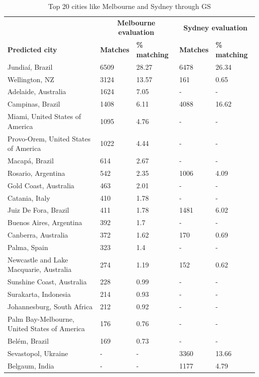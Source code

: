 \documentclass[sageh,times]{sagej}
\begin{document}
\begin{table}[!htbp]
\caption{Top 20 cities like Melbourne and Sydney through GS \label{tab:melbournesydneyGS}}     
\begin{tabular}{| l | l |l| l | l|}
\hline
 \hline    &  \multicolumn{2}{c|}{\textbf{Melbourne evaluation}} & \multicolumn{2}{c|}{\textbf{Sydney evaluation}}  \\  
\textbf{Predicted city} & \textbf{Matches} & \textbf{\% matching}  & \textbf{Matches} & \textbf{\% matching}\\ \hline
Jundia\'{i}, Brazil & 6509 & 28.27 & 6478 & 26.34 \\ \hline
Wellington, NZ & 3124 & 13.57 & 161 & 0.65 \\ \hline
Adelaide, Australia & 1624 & 7.05 &-&- \\ \hline
Campinas, Brazil & 1408 & 6.11 & 4088 & 16.62 \\ \hline
Miami, United States of America & 1095 & 4.76 &-&- \\ \hline
Provo-Orem, United States of America & 1022 & 4.44 &-&- \\ \hline
Macap\'{a}, Brazil & 614 & 2.67 &-&- \\ \hline
Rosario, Argentina & 542 & 2.35 & 1006 & 4.09 \\ \hline
Gold Coast, Australia & 463 & 2.01 &-&- \\ \hline
Catania, Italy & 410 & 1.78 &-&- \\ \hline
Juiz De Fora, Brazil & 411 & 1.78 & 1481 & 6.02 \\ \hline
Buenos Aires, Argentina & 392 & 1.7 &-&- \\ \hline
Canberra, Australia & 372 & 1.62 & 170 & 0.69 \\ \hline
Palma, Spain & 323 & 1.4 &-&- \\ \hline
Newcastle and Lake Macquarie, Australia & 274 & 1.19 & 152 & 0.62 \\ \hline
Sunshine Coast, Australia & 228 & 0.99 &-&- \\ \hline
Surakarta, Indonesia & 214 & 0.93 &-&- \\ \hline
Johannesburg, South Africa & 212 & 0.92 &-&- \\ \hline
Palm Bay-Melbourne, United States of America & 176 & 0.76 &-&- \\ \hline
Bel\'{e}m, Brazil & 169 & 0.73 &-&- \\ \hline
Sevastopol, Ukraine &-&- & 3360 & 13.66\\ \hline
Belgaum, India &-&- & 1177 & 4.79\\ \hline

\end{tabular}
\end{table}
\end{document}
